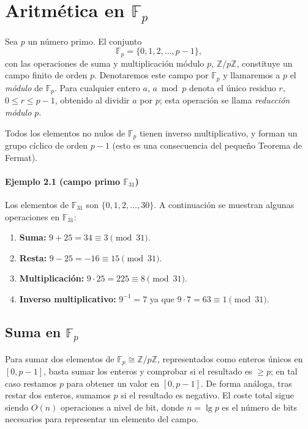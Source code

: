 \section{Aritmética en \texorpdfstring{$\mathbb{F}_p$}{Fp}}
Sea $p$ un número primo. El conjunto
$$
  \mathbb{F}_p = \{0,1,2,\dots,p-1\},
$$
con las operaciones de suma y multiplicación módulo $p$, $\mathbb{Z}/p\mathbb{Z}$, constituye un campo finito de orden $p$. Denotaremos este campo por $\mathbb{F}_p$ y llamaremos a $p$ el \emph{módulo} de $\mathbb{F}_p$. Para cualquier entero $a$, $a \bmod p$ denota el único residuo $r$, $0\le r\le p-1$, obtenido al dividir $a$ por $p$; esta operación se llama \emph{reducción módulo $p$}.

Todos los elementos no nulos de $\mathbb{F}_p$ tienen inverso multiplicativo, y forman un grupo cíclico de orden $p-1$ (esto es una consecuencia del pequeño Teorema de Fermat).

\paragraph{Ejemplo 2.1 (campo primo $\mathbb{F}_{31}$)}  
Los elementos de $\mathbb{F}_{31}$ son $\{0,1,2,\dots,30\}$. A continuación se muestran algunas operaciones en $\mathbb{F}_{31}$:

\begin{enumerate}
  \item \textbf{Suma:} $9 + 25 = 34 \equiv 3 \pmod{31}.$
  \item \textbf{Resta:} $9 - 25 = -16 \equiv 15 \pmod{31}.$
  \item \textbf{Multiplicación:} $9 \cdot 25 = 225 \equiv 8 \pmod{31}.$
  \item \textbf{Inverso multiplicativo:} $9^{-1} = 7$ ya que $9 \cdot 7 = 63 \equiv 1 \pmod{31}.$
\end{enumerate}

\subsection{Suma en $\mathbb{F}_p$}
Para sumar dos elementos de \(\mathbb{F}_p\cong\mathbb{Z}/p\mathbb{Z}\), representados como enteros únicos en \([0,p-1]\), basta sumar los enteros y comprobar si el resultado es \(\ge p\); en tal caso restamos \(p\) para obtener un valor en \([0,p-1]\). De forma análoga, tras restar dos enteros, sumamos \(p\) si el resultado es negativo. El coste total sigue siendo \(O(n)\) operaciones a nivel de bit, donde \(n=\lg p\) es el número de bits necesarios para representar un elemento del campo.

